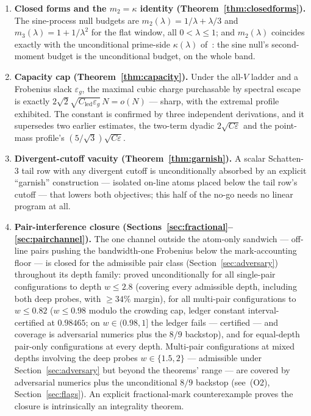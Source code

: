 \documentclass[11pt]{article}
\theoremstyle{plain}
\theoremstyle{definition}
\theoremstyle{remark}
\newcommand{\Cled}{C_{\mathrm{led}}}
\begin{document}
\begin{enumerate}
\item \textbf{Closed forms and the $m_2 = \kappa$ identity
(Theorem~\ref{thm:closedforms}).} The sine-process null budgets are
$m_2(\lambda) = 1/\lambda + \lambda/3$ and $m_3(\lambda) = 1 + 1/\lambda^2$ for
the flat window, all $0 < \lambda \le 1$; and $m_2(\lambda)$ coincides exactly
with the unconditional prime-side $\kappa(\lambda)$ of~\cite{AF26}: the sine
null's second-moment budget is the unconditional budget, on the whole band.

\item \textbf{Capacity cap (Theorem~\ref{thm:capacity}).} Under the all-$V$
ladder and a Frobenius slack $\varepsilon_g$, the maximal cubic charge
purchasable by spectral escape is exactly
$2\sqrt{2}\sqrt{\Cled \varepsilon_g}\,N = o(N)$ --- sharp, with the extremal
profile exhibited. The constant is confirmed by three independent derivations,
and it supersedes two earlier estimates, the two-term dyadic
$2\sqrt{C\varepsilon}$ and the point-mass profile's
$(5/\sqrt{3})\sqrt{C\varepsilon}$.

\item \textbf{Divergent-cutoff vacuity (Theorem~\ref{thm:garnish}).} A scalar
Schatten-$3$ tail row with any divergent cutoff is unconditionally absorbed by an
explicit ``garnish'' construction --- isolated on-line atoms placed below the
tail row's cutoff --- that lowers both objectives; this half of the no-go needs
no linear program at all.

\item \textbf{Pair-interference closure
(Sections~\ref{sec:fractional}--\ref{sec:pairchannel}).} The one channel outside
the atom-only sandwich --- off-line pairs pushing the bandwidth-one Frobenius
below the mark-accounting floor --- is closed for the admissible pair class
(Section~\ref{sec:adversary}) throughout its depth family: proved
unconditionally for all single-pair configurations to depth $w \le 2.8$
(covering every admissible depth, including both
deep probes, with $\ge 34\%$ margin), for all multi-pair configurations to
$w \le 0.82$ ($w \le 0.98$ modulo the crowding cap, ledger constant
interval-certified at $0.98465$; on $w \in (0.98, 1]$ the ledger fails ---
certified --- and coverage is adversarial numerics plus the $8/9$ backstop), and
for equal-depth pair-only configurations at every depth. Multi-pair
configurations at mixed depths involving the deep probes $w \in \{1.5, 2\}$ ---
admissible under Section~\ref{sec:adversary} but beyond the theorems' range ---
are covered by adversarial numerics plus the unconditional $8/9$ backstop
(see~(O2),
Section~\ref{sec:flags}). An explicit fractional-mark counterexample proves the
closure is intrinsically an integrality theorem.
\end{enumerate}
\end{document}
